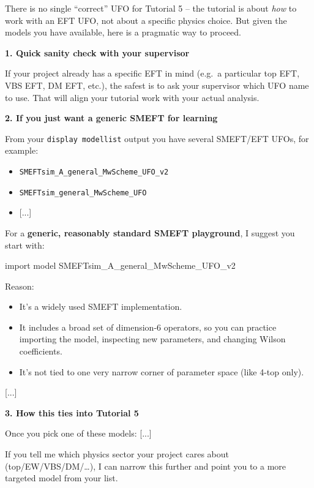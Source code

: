 \documentclass[submission, Phys]{SciPost}
\begin{document}
\begin{promptblock}[\ma (shortened)]
There is no single ``correct'' UFO for Tutorial 5 -- the tutorial is about \textit{how} to work with an EFT UFO, not about a specific physics choice. But given the models you have available, here is a pragmatic way to proceed.

\textbf{1. Quick sanity check with your supervisor}

If your project already has a specific EFT in mind (e.g.\ a particular top EFT, VBS EFT, DM EFT, etc.), the safest is to ask your supervisor which UFO name to use. That will align your tutorial work with your actual analysis.

\textbf{2. If you just want a generic SMEFT for learning}

From your \lstinline|display modellist| output you have several SMEFT/EFT UFOs, for example:
\begin{itemize}
\item \lstinline|SMEFTsim_A_general_MwScheme_UFO_v2|
\item \lstinline|SMEFTsim_general_MwScheme_UFO|
\item {[...]}
\end{itemize}

For a \textbf{generic, reasonably standard SMEFT playground}, I suggest you start with:

\begin{bashblock}
import model SMEFTsim_A_general_MwScheme_UFO_v2
\end{bashblock}

Reason:
\begin{itemize}
\item It’s a widely used SMEFT implementation.
\item It includes a broad set of dimension-6 operators, so you can practice importing the model, inspecting new parameters, and changing Wilson coefficients.
\item It’s not tied to one very narrow corner of parameter space (like 4-top only).
\end{itemize}

[...]

\textbf{3. How this ties into Tutorial 5}

Once you pick one of these models: [...]

If you tell me which physics sector your project cares about (top/EW/VBS/DM/\dots), I can narrow this further and point you to a more targeted model from your list.
\end{promptblock}
\end{document}
